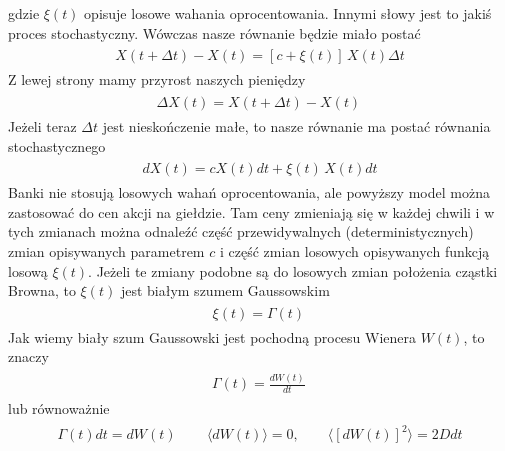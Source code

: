 \documentclass[a4paper,12pt,polish]{sphinxmanual}
\begin{document}
gdzie $\xi(t)$ opisuje losowe wahania oprocentowania. Innymi słowy jest to jakiś proces stochastyczny. Wówczas nasze równanie będzie miało postać
\label{ch3/chIII033:equation-eqn5}\begin{gather}
\begin{split}X(t+\Delta t) - X(t) = [c + \xi(t)]\, X(t) \Delta t\end{split}\label{ch3/chIII033-eqn5}
\end{gather}
Z lewej strony mamy przyrost naszych pieniędzy
\label{ch3/chIII033:equation-eqn6}\begin{gather}
\begin{split}\Delta X(t) = X(t+\Delta t) - X(t) \,\end{split}\label{ch3/chIII033-eqn6}
\end{gather}
Jeżeli teraz $\Delta t$ jest nieskończenie małe, to nasze równanie ma postać równania stochastycznego
\label{ch3/chIII033:equation-eqn7}\begin{gather}
\begin{split}dX(t) = c X(t) dt + \xi(t)\, X(t) dt\end{split}\label{ch3/chIII033-eqn7}
\end{gather}
Banki nie stosują losowych wahań oprocentowania, ale powyższy model można zastosować do cen akcji na giełdzie. Tam ceny zmieniają się w każdej chwili i w tych zmianach można odnaleźć część przewidywalnych (deterministycznych) zmian opisywanych parametrem $c$ i część zmian losowych opisywanych funkcją losową $\xi(t)$. Jeżeli te zmiany podobne są do losowych zmian położenia cząstki Browna, to $\xi(t)$ jest białym szumem Gaussowskim
\label{ch3/chIII033:equation-eqn8}\begin{gather}
\begin{split}\xi(t) = \Gamma(t)\,\end{split}\label{ch3/chIII033-eqn8}
\end{gather}
Jak wiemy biały szum Gaussowski jest pochodną procesu Wienera $W(t)$, to znaczy
\label{ch3/chIII033:equation-eqn9}\begin{gather}
\begin{split}\Gamma(t) = \frac{dW(t)}{dt}\,\end{split}\label{ch3/chIII033-eqn9}
\end{gather}
lub równoważnie
\label{ch3/chIII033:equation-eqn10}\begin{gather}
\begin{split}\Gamma(t) dt = dW(t)\, \qquad \langle dW(t) \rangle = 0, \qquad \langle[dW(t)]^2 \rangle = 2D dt\end{split}\label{ch3/chIII033-eqn10}
\end{gather}
\end{document}
